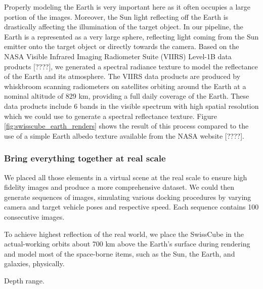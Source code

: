 Properly modeling the Earth is very important here as it often occupies a large portion of the images. Moreover, the Sun light reflecting off the Earth is drastically affecting the illumination of the target object. In our pipeline, the Earth is a represented as a very large sphere, reflecting light coming from the Sun emitter onto the target object or directly towards the camera. Based on the NASA Visible Infrared Imaging Radiometer Suite (VIIRS) Level-1B data products [????], we generated a spectral radiance texture to model the reflectance of the Earth and its atmosphere. The VIIRS data products are produced by whiskbroom scanning radiometers on satellites orbiting around the Earth at a nominal altitude of 829 km, providing a full daily coverage of the Earth. These data products include 6 bands in the visible spectrum with high spatial resolution which we could use to generate a spectral reflectance texture. Figure \ref{fig:swisscube_earth_renders} shows the result of this process compared to the use of a simple Earth albedo texture available from the NASA website [????].




\subsubsection{Bring everything together at real scale}

We placed all those elements in a virtual scene at the real scale to ensure high fidelity images and produce a more comprehensive dataset. We could then generate sequences of images, simulating various docking procedures by varying camera and target vehicle poses and respective speed. Each sequence contains 100 consecutive images.



To achieve highest reflection of the real world, we place the SwissCube in the actual-working orbits about 700 km above the Earth's surface during rendering and model most of the space-borne items, such as the Sun, the Earth, and galaxies, physically. 

Depth range.


